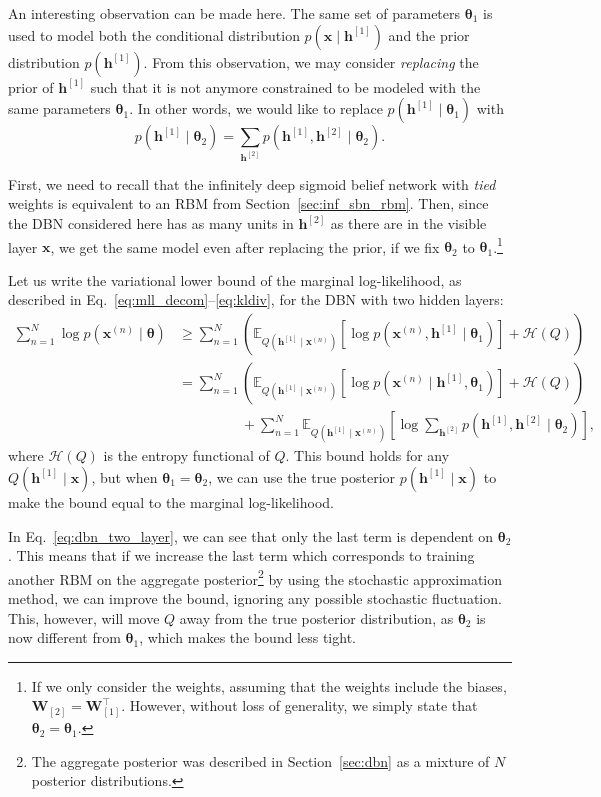 \documentclass[dissertation,nocontribution]{aaltoseries}
\newcommand{\qlay}[1]{\left[#1\right]}
\newcommand{\vect}[1]{\mathbf{#1}}
\newcommand{\vects}[1]{\boldsymbol{#1}}
\newcommand{\matr}[1]{\mathbf{#1}}
\newcommand{\vh}[0]{\vect{h}}
\newcommand{\vx}[0]{\vect{x}}
\newcommand{\mW}[0]{\matr{W}}
\newcommand{\TT}[0]{{\vects{\theta}}}
\newcommand{\HH}[0]{\mathcal{H}}
\newcommand{\E}[0]{\mathbb{E}}
\begin{document}
An interesting observation can be made here.  The same set
of parameters $\TT_1$ is used to model both the
conditional distribution $p(\vx \mid \vh^{\qlay{1}})$ and the
prior distribution $p(\vh^{\qlay{1}})$. From this observation, 
we may consider \textit{replacing} the prior of
$\vh^{\qlay{1}}$ such that it is not anymore constrained to be
modeled with the same parameters $\TT_1$.
In other words, we would like to replace
$p(\vh^{\qlay{1}} \mid \TT_1)$ with
\[
p(\vh^{\qlay{1}} \mid \TT_2) = \sum_{\vh^{\qlay{2}}}
p(\vh^{\qlay{1}},
\vh^{\qlay{2}} \mid \TT_2).
\]

First, we need to recall that the infinitely deep sigmoid
belief network with \textit{tied} weights is equivalent to
an RBM from Section~\ref{sec:inf_sbn_rbm}. Then, since the DBN
considered here has as many units in $\vh^{\qlay{2}}$ as there
are in the visible layer $\vx$, we get the same model even
after replacing the prior, if we fix $\TT_2$ to
$\TT_1$.\footnote{ If we only consider the weights, assuming
that the weights include the biases,
$\mW_{\qlay{2}}=\mW_{\qlay{1}}^\top$.
However, without loss of generality, we simply state that
$\TT_2=\TT_1$.  }

Let us write the variational lower bound of the marginal
log-likelihood, as described in
Eq.~\eqref{eq:mll_decom}--\eqref{eq:kldiv}, for the DBN with
two hidden layers:
\begin{align}
    \label{eq:dbn_two_layer}
    \sum_{n=1}^N \log p(\vx^{(n)} \mid \TT) &\geq
    \sum_{n=1}^N \left(\E_{Q(\vh^{\qlay{1}} \mid \vx^{(n)})} \left[
    \log p(\vx^{(n)}, \vh^{\qlay{1}} \mid \TT_1)
    \right] + \HH(Q)\right) 
    \nonumber \\
    &= \sum_{n=1}^N \left(\E_{Q(\vh^{\qlay{1}} \mid \vx^{(n)})} \left[
    \log p(\vx^{(n)} \mid \vh^{\qlay{1}}, \TT_1) \right] +
    \HH(Q)\right)
    \nonumber \\
    &\phantom{= \sum_{n=1}^N} + \sum_{n=1}^N
    \E_{Q(\vh^{\qlay{1}} \mid \vx^{(n)})} \left[ \log
    \sum_{\vh^{\qlay{2}}} p(\vh^{\qlay{1}}, \vh^{\qlay{2}} \mid \TT_2) \right]
    ,
\end{align}
where $\HH(Q)$ is the entropy functional of $Q$. This bound
holds for any $Q(\vh^{\qlay{1}} \mid \vx)$, but when $\TT_1 =
\TT_2$, we can use the true posterior $p(\vh^{\qlay{1}} \mid
\vx)$ to make the bound equal to the marginal
log-likelihood.

In Eq.~\eqref{eq:dbn_two_layer}, we can see that only the
last term is dependent on $\TT_2$. This means that if we
increase the last term which corresponds to training another
RBM on the aggregate posterior\footnote{The aggregate
posterior was described in Section~\ref{sec:dbn} as a
mixture of $N$ posterior distributions.} by using the
stochastic approximation method, we can improve the bound,
ignoring any possible stochastic fluctuation. 
This, however, will move $Q$ away from the true posterior
distribution, as $\TT_2$ is now different from $\TT_1$,
which makes the bound less tight.
\end{document}
